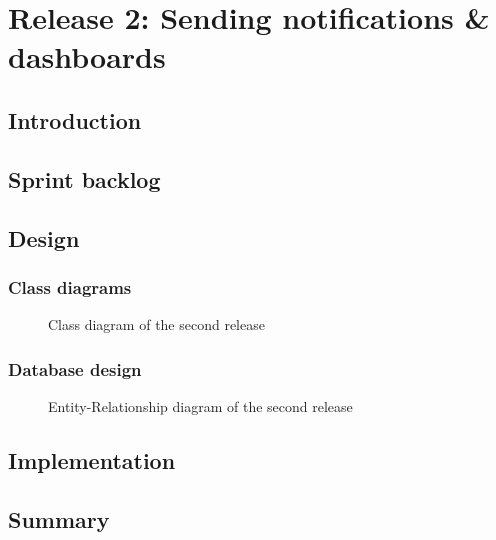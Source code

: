 \chapter{Release 2: Sending notifications \& dashboards}

\section*{Introduction}

\section{Sprint backlog}
\section{Design}
\subsection{Class diagrams}
\begin{landscape}
    \begin{figure}[hbt!]
        \centering
        
        \caption{Class diagram of the second release}
        \label{r2-class}
    \end{figure}
\end{landscape}

\subsection{Database design}
\begin{landscape}
    \begin{figure}[hbt!]
        \centering
        
        \caption{Entity-Relationship diagram of the second release}
        \label{r2-erd}
    \end{figure}
\end{landscape}
\section{Implementation}

\section*{Summary}
